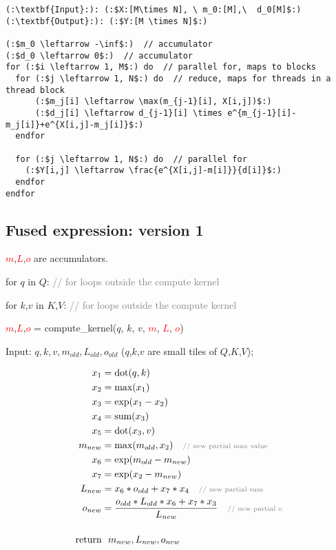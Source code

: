 \begin{lstlisting}[language=code_example2, caption={}]
(:\textbf{Input}:): (:$X:[M\times N], \ m_0:[M],\  d_0[M]$:)
(:\textbf{Output}:): (:$Y:[M \times N]$:)

(:$m_0 \leftarrow -\inf$:)  // accumulator
(:$d_0 \leftarrow 0$:)  // accumulator
for (:$i \leftarrow 1, M$:) do  // parallel for, maps to blocks
  for (:$j \leftarrow 1, N$:) do  // reduce, maps for threads in a thread block
      (:$m_j[i] \leftarrow \max(m_{j-1}[i], X[i,j])$:)
      (:$d_j[i] \leftarrow d_{j-1}[i] \times e^{m_{j-1}[i]-m_j[i]}+e^{X[i,j]-m_j[i]}$:)
  endfor

  for (:$j \leftarrow 1, N$:) do  // parallel for
    (:$Y[i,j] \leftarrow \frac{e^{X[i,j]-m[i]}}{d[i]}$:)
  endfor
endfor
\end{lstlisting}

\subsection{Fused expression: version 1}

\textcolor{red}{$m$},\textcolor{red}{$L$},\textcolor{red}{$o$} are accumulators.

\begin{tcolorbox}
for $q$ in $Q$: \textcolor{grey}{\scriptsize{// for loops outside the compute kernel}}

\quad for $k$,$v$ in $K$,$V$:  \textcolor{grey}{\scriptsize{// for loops outside the compute kernel}}

\quad \quad \textcolor{red}{$m$},\textcolor{red}{$L$},\textcolor{red}{$o$} = compute\_kernel($q$, $k$, $v$, \textcolor{red}{$m$}, \textcolor{red}{$L$}, \textcolor{red}{$o$})

\end{tcolorbox}

Input: $q, k, v, m_{old}, L_{old}, o_{old}$ ($q$,$k$,$v$ are small tiles of $Q$,$K$,$V$);

\begin{align*}
    x_1 &= \text{dot}(q,k) \\
    x_2 &= \text{max}(x_1) \\
    x_3 &= \text{exp}(x_1 - x_2) \\
    x_4 &= \text{sum}(x_3) \\
    x_5 &= \text{dot}(x_3,v) \\
    m_{new} &= \text{max}({m_{old},x_2})\ \ \ \scriptsize{\textcolor{grey}{\text{// new partial max value}}}\\
    x_6 &= \text{exp}(m_{old} - m_{new}) \\
    x_7 &= \text{exp}(x_2 - m_{new}) \\
    L_{new} &= x_6 * o_{old} + x_7 * x_4 \ \ \ \scriptsize{\textcolor{grey}{\text{// new partial sum}}}\\
    o_{new} &= \frac{o_{old} * L_{old} * x_6 + x_7 * x_3}{L_{new}} \ \ \ \scriptsize{\textcolor{grey}{\text{// new partial o}}}\\\\
    \text{return}&\ \ {m_{new}, L_{new}, o_{new}}
\end{align*}